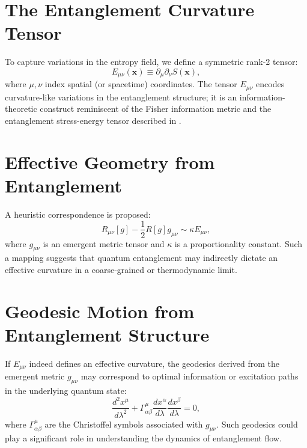 \documentclass[12pt]{article}
\begin{document}
\section{The Entanglement Curvature Tensor}
To capture variations in the entropy field, we define a symmetric rank-2 tensor:
\begin{equation}
  E_{\mu\nu}(\bm{x}) \equiv \partial_\mu \partial_\nu S(\bm{x}),
\end{equation}
where $\mu,\nu$ index spatial (or spacetime) coordinates. The tensor $E_{\mu\nu}$ encodes curvature-like variations in the entanglement structure; it is an information-theoretic construct reminiscent of the Fisher information metric and the entanglement stress-energy tensor described in \cite{Blanco2013}.

\section{Effective Geometry from Entanglement}
A heuristic correspondence is proposed:
\begin{equation}
  R_{\mu\nu}[g] - \frac{1}{2} R[g] g_{\mu\nu} \sim \kappa E_{\mu\nu},
\end{equation}
where $g_{\mu\nu}$ is an emergent metric tensor and $\kappa$ is a proportionality constant. Such a mapping suggests that quantum entanglement may indirectly dictate an effective curvature in a coarse-grained or thermodynamic limit.

\section{Geodesic Motion from Entanglement Structure}
If $E_{\mu\nu}$ indeed defines an effective curvature, the geodesics derived from the emergent metric $g_{\mu\nu}$ may correspond to optimal information or excitation paths in the underlying quantum state:
\begin{equation}
  \frac{d^2 x^\mu}{d\lambda^2} + \Gamma^\mu_{\alpha\beta} \frac{dx^\alpha}{d\lambda} \frac{dx^\beta}{d\lambda} = 0,
\end{equation}
where $\Gamma^\mu_{\alpha\beta}$ are the Christoffel symbols associated with $g_{\mu\nu}$. Such geodesics could play a significant role in understanding the dynamics of entanglement flow.
\end{document}
